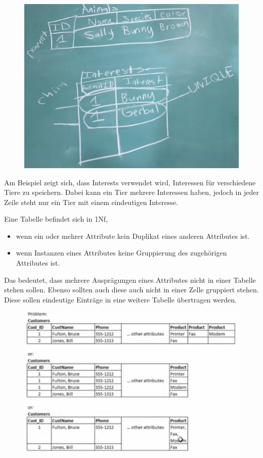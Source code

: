 \begin{figure}[H]
	\centering
	\includegraphics[scale = 0.3]{attachment/chapter_3/Scc034}
	\caption{}
	\label{fig:Scc034}
\end{figure}
Am Beispiel zeigt sich, dass Interests verwendet wird, Interessen für verschiedene Tiere zu speichern. Dabei kann ein Tier mehrere Interessen haben, jedoch in jeder Zeile steht nur ein Tier mit einem eindeutigen Interesse.
\begin{center}
Eine Tabelle befindet sich in 1Nf, 
\begin{itemize}
\item wenn ein oder mehrer Attribute kein Duplikat eines anderen Attributes ist.
\item wenn Instanzen eines Attributes keine Gruppierung des zugehörigen Attributes ist.
\end{itemize}
\end{center}

Das bedeutet, dass mehrere Ausprägungen eines Attributes nicht in einer Tabelle stehen sollen. Ebenso sollten auch diese auch nicht in einer Zelle gruppiert stehen. Diese sollen eindeutige Einträge in eine weitere Tabelle übertragen werden.

\begin{figure}[H]
	\centering
	\includegraphics[scale = 0.3]{attachment/chapter_3/Scc033}
	\caption{}
	\label{fig:Scc033}
\end{figure}

